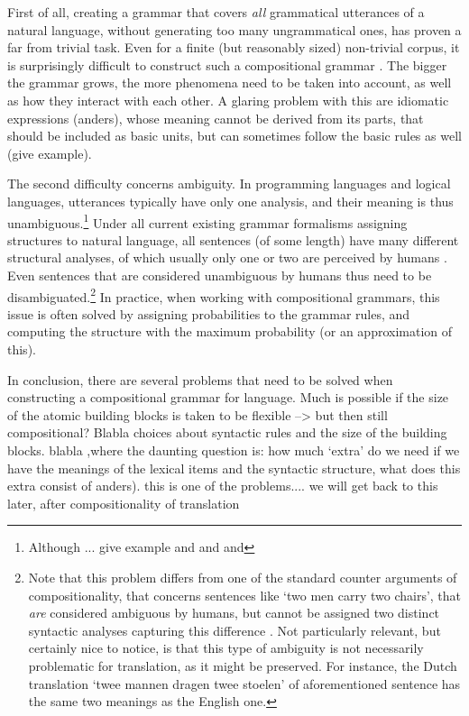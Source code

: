 \documentclass{report}
\theoremstyle{break}
\begin{document}
First of all, creating a grammar that covers \textit{all} grammatical utterances of a natural language, without generating too many ungrammatical ones, has proven a far from trivial task. Even for a finite (but reasonably sized) non-trivial corpus, it is surprisingly difficult to construct such a compositional grammar \citep{scha1990taaltheorie}. The bigger the grammar grows, the more phenomena need to be taken into account, as well as how they interact with each other. A glaring problem with this are idiomatic expressions (anders), whose meaning cannot be derived from its parts, that should be included as basic units, but can sometimes follow the basic rules as well (give example).

The second difficulty concerns ambiguity. In programming languages and logical languages, utterances typically have only one analysis, and their meaning is thus unambiguous.\footnote{Although ... give example and and and} Under all current existing grammar formalisms assigning structures to natural language, all sentences (of some length) have many different structural analyses, of which usually only one or two are perceived by humans \citep{scha1990taaltheorie}. Even sentences that are considered unambiguous by humans thus need to be disambiguated.\footnote{Note that this problem differs from one of the standard counter arguments of compositionality, that concerns sentences like `two men carry two chairs', that \textit{are} considered ambiguous by humans, but cannot be assigned two distinct syntactic analyses capturing this difference \citep{pelletier1994principle}. Not particularly relevant, but certainly nice to notice, is that this type of ambiguity is not necessarily problematic for translation, as it might be preserved. For instance, the Dutch translation `twee mannen dragen twee stoelen' of aforementioned sentence has the same two meanings as the English one.} In practice, when working with compositional grammars, this issue is often solved by assigning probabilities to the grammar rules, and computing the structure with the maximum probability (or an approximation of this).

In conclusion, there are several problems that need to be solved when constructing a compositional grammar for language. Much is possible if the size of the atomic building blocks is taken to be flexible --> but then still compositional?
Blabla choices about syntactic rules and the size of the building blocks. blabla ,where the daunting question is: how much `extra' do we need if we have the meanings of the lexical items and the syntactic structure, what does this extra consist of anders). this is one of the problems.... we will get back to this later, after compositionality of translation
\end{document}
